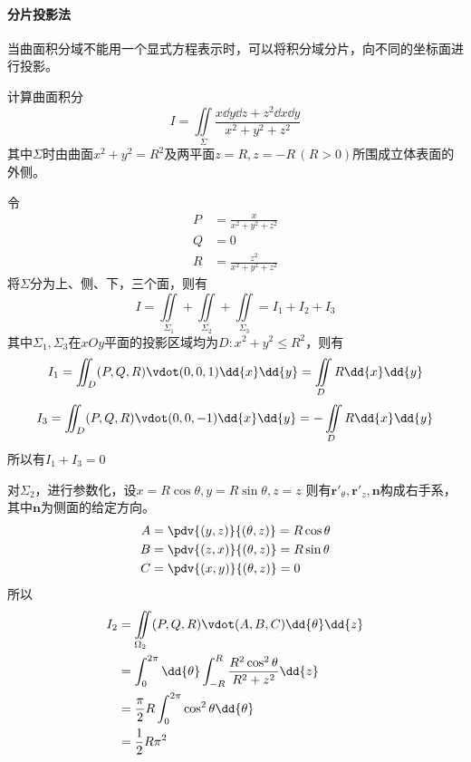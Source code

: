 \paragraph{分片投影法}
当曲面积分域不能用一个显式方程表示时，可以将积分域分片，向不同的坐标面进行投影。
\begin{example}
    计算曲面积分
    \[ I = \iint\limits_\Sigma \frac{x\dd{y}\dd{z} + z^2\dd{x}\dd{y}}{x^2+y^2+z^2} \]
    其中$\Sigma$时由曲面$x^2+y^2=R^2$及两平面$z=R,z=-R\,(R>0)$所围成立体表面的外侧。
\end{example}
\begin{solution}
    令
    \begin{align*}
        P & = \frac{x}{x^2 + y^2 + z^2}   \\
        Q & = 0                           \\
        R & = \frac{z^2}{x^2 + y^2 + z^2}
    \end{align*}
    将$\Sigma$分为上、侧、下，三个面，则有
    \[ I = \iint\limits_{\Sigma_1} + \iint\limits_{\Sigma_2} + \iint\limits_{\Sigma_3} = I_1 + I_2 + I_3 \]
    其中$\Sigma_1,\Sigma_3$在$xOy$平面的投影区域均为$D : x^2+y^2\leq R^2$，则有
    \[ I_1 = \iint_D (P,Q,R)\vdot(0,0,1)\dd{x}\dd{y} = \iint\limits_D R\dd{x}\dd{y} \]
    \[ I_3 = \iint_D (P,Q,R)\vdot(0,0,-1)\dd{x}\dd{y} = -\iint\limits_D R\dd{x}\dd{y} \]
    所以有$I_1+I_3=0$

    对$\Sigma_2$，进行参数化，设$x=R\cos\theta, y=R\sin\theta, z=z$
    则有$\bm{r}'_\theta,\bm{r}'_z,\bm{n}$构成右手系，其中$\bm{n}$为侧面的给定方向。
    \begin{align*}
        A & = \pdv{(y,z)}{(\theta,z)} = R\cos\theta \\
        B & = \pdv{(z,x)}{(\theta,z)} = R\sin\theta \\
        C & = \pdv{(x,y)}{(\theta,z)} = 0
    \end{align*}
    所以
    \begin{align*}
        I_2 & = \iint\limits_{\Omega_2} (P,Q,R)\vdot(A,B,C)\dd{\theta}\dd{z}                \\
            & =\int_0^{2\pi}\dd{\theta}\int_{-R}^R \frac{R^2\cos^2\theta}{R^2 + z^2} \dd{z} \\
            & = \frac{\pi}{2}R\int_0^{2\pi} \cos^2\theta \dd{\theta}                        \\
            & =\frac{1}{2}R\pi^2
    \end{align*}
\end{solution}

